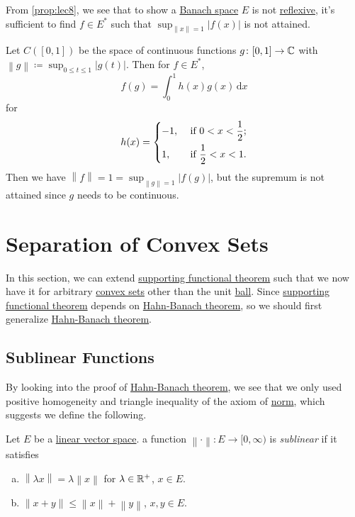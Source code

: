 From \autoref{prop:lec8}, we see that to show a \hyperref[def:Banach-space]{Banach space} \(E\) is not \hyperref[def:reflexive-space]{reflexive}, it's sufficient to find \(f\in E^{\ast} \) such that \(\sup _{\left\lVert x\right\rVert = 1}\left\vert f(x) \right\vert \) is not attained.

\begin{eg}
	Let \(C([0, 1])\) be the space of continuous functions \(g\colon [0, 1]\to \mathbb{\MakeUppercase{c}}\) with \(\left\lVert g\right\rVert \coloneqq \sup _{0 \leq t\leq 1} \left\vert g(t) \right\vert \). Then for \(f\in E^{\ast} \),
	\[
		f(g) = \int _0 ^1 h(x)g(x)\,\mathrm{d} x
	\]
	for
	\[
		h(x) = \begin{dcases}
			-1, & \text{ if } 0 < x < \frac{1}{2}; \\
			1,  & \text{ if } \frac{1}{2} < x < 1.
		\end{dcases}
	\]
	Then we have \(\left\lVert f\right\rVert = 1 = \sup _{\left\lVert g\right\rVert = 1}\left\vert f(g) \right\vert \), but the supremum is not attained since \(g\) needs to be continuous.
\end{eg}

\section{Separation of Convex Sets}
In this section, we can extend \hyperref[thm:supporting-functional]{supporting functional theorem} such that we now have it for arbitrary \hyperref[def:convex-set]{convex sets} other than the unit \hyperref[def:ball]{ball}. Since \hyperref[thm:supporting-functional]{supporting functional theorem} depends on \hyperref[thm:Hahn-Banach]{Hahn-Banach theorem}, so we should first generalize \hyperref[thm:Hahn-Banach]{Hahn-Banach theorem}.
\subsection{Sublinear Functions}
By looking into the proof of \hyperref[thm:Hahn-Banach]{Hahn-Banach theorem}, we see that we only used positive homogeneity and triangle inequality of the axiom of \hyperref[def:norm]{norm}, which suggests we define the following.

\begin{definition}[Sublinear]\label{def:sublinear}
	Let \(E\) be a \hyperref[def:linear-vector-space]{linear vector space}. a function \(\left\lVert \cdot\right\rVert \colon E \to [0, \infty )\) is \emph{sublinear} if it satisfies
	\begin{enumerate}[(a)]
		\item \(\left\lVert \lambda x\right\rVert = \lambda \left\lVert x\right\rVert \) for \(\lambda \in \mathbb{\MakeUppercase{r}}^+ \), \(x\in E\).
		\item \(\left\lVert x + y\right\rVert \leq \left\lVert x\right\rVert + \left\lVert y\right\rVert\), \(x, y\in E\).
	\end{enumerate}
\end{definition}

